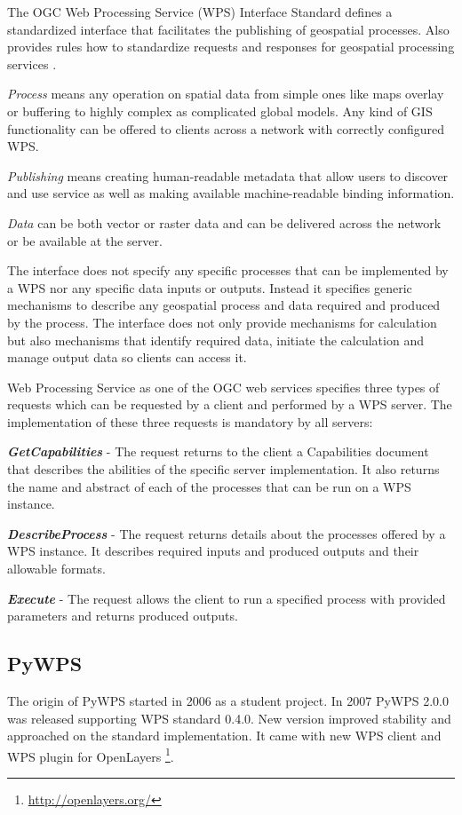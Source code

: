 \documentclass{gifce}
\begin{document}
The OGC Web Processing Service (WPS) Interface Standard defines a standardized interface
that facilitates the publishing of geospatial processes. Also provides rules how to standardize
requests and responses for geospatial processing services \cite{WPS_standart_1.0}. 

\textit{Process} means any operation on spatial
data from simple ones like maps overlay or buffering to highly complex as complicated global models. Any kind of GIS 
functionality can be offered to clients across a network with correctly configured WPS. 

\textit{Publishing} means
creating human-readable metadata that allow users to discover and use service as well as making 
available machine-readable binding information.

\textit{Data} can be both vector or raster data and can be delivered across the network or be available
at the server.

The interface does not specify any specific processes that can be implemented by a WPS nor any specific
data inputs or outputs. Instead it specifies generic mechanisms to describe any geospatial process and
data required and produced by the process. The interface does not only provide mechanisms for calculation
but also mechanisms that identify required data, initiate the calculation and manage output data so clients
can access it. 

\bigskip
Web Processing Service as one of the OGC web services specifies three types of requests which can be requested
by a client and performed by a WPS server. The implementation of these three requests is mandatory by all servers:

\textbf{\textit{GetCapabilities}} - The request returns to the client a Capabilities document that describes the abilities
of the specific server implementation. It also returns the name and abstract of each of the processes that can
be run on a WPS instance.

\textbf{\textit{DescribeProcess}} - The request returns details about the processes offered by a WPS instance. 
It describes required inputs and produced outputs and their allowable formats.

\textbf{\textit{Execute}} - The request allows the client to run a specified process with provided parameters and returns
produced outputs.


\subsection{PyWPS}
The origin of PyWPS started in 2006 as a student project. 
In 2007 PyWPS 2.0.0 was released supporting WPS standard 0.4.0. New
version improved stability and approached on the standard
implementation. It came with new WPS client and WPS plugin for
OpenLayers \footnote{\url{http://openlayers.org/}}.
\end{document}
